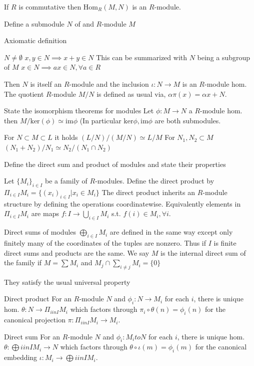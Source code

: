 If \(R\) is commutative then \(\text{Hom}_{R}(M, N)\) is an \(R\)-module.


Define a submodule \(N\) of and \(R\)-module \(M\)

Axiomatic definition

\(N \neq \emptyset\)
\(x, y \in N \implies x + y \in N\)
This can be summarized with \(N\) being a subgroup of \(M\)
\(x \in N \implies ax \in N, \forall a \in R\)

Then \(N\) is itself an \(R\)-module and the inclusion \(\iota : N \to M\) 
is an \(R\)-module hom.
The quotient \(R\)-module \(M/N\) is defined as usual via, \(\alpha\pi(x) = \alpha x + N\).

State the isomorphism theorems for modules
Let \(\phi: M \to N\) a \(R\)-module hom.
then \(M/\text{ker}(\phi) \simeq \text{im}\phi\)
(In particular \(\text{ker}\phi, \text{im}\phi\) are both submodules.

For \(N \subset M \subset L\) it holds
\( (L/N)/(M/N) \simeq L/M\)
For \(N_1, N_2 \subset M\) 
\((N_1 + N_2)/N_1 \simeq N_2/(N_1 \cap N_2)\)


Define the direct sum and product of modules
and state their properties


Let \(\{M_i\}_{i \in I}\) be a family of 
\(R\)-modules. Define the direct product by
\(\Pi_{i \in I} M_i = \{(x_i)_{i \in I} | x_i \in M_i\}\)
The direct product inherits an 
\(R\)-module structure by defining the operations coordinatewise.
Equivalently elements in \(\Pi_{i \in I} M_i\) are maps \(f : I \to \bigcup_{i \in I} M_i\)
s.t. \(f(i) \in M_i, \forall i\).

Direct sums of modules 
\(\bigoplus_{i \in I} M_i\)
are defined in the same way except only finitely many of the coordinates of the tuples are nonzero. 
Thus if \(I\) is finite direct sums and products are the same.
We say \(M\) is the internal direct sum of the family if 
\(M = \sum M_i\) and \(M_j \cap \sum_{i \neq j} M_i = \{0\}\)

They satisfy the usual universal property 

Direct product
For an \(R\)-module \(N\) and \(\phi_i : N \to M_i\) for each \(i\),
there is unique hom. \(\theta : N \to \Pi_{i in I} M_i\) which factors through
\(\pi_i \circ \theta(n) = \phi_i(n)\) for the canonical projection \(\pi : \Pi_{i in I} M_i \to M_i\).

Direct sum
For an \(R\)-module \(N\) and \(\phi_i : M_i to N\) for each \(i\),
there is unique hom. \(\theta : \bigoplus{i in I} M_i \to N\) which factors through
\(\theta \circ \iota (m) = \phi_i(m)\) for the canonical embedding \(\iota : M_i \to \bigoplus{i in I} M_i\).


